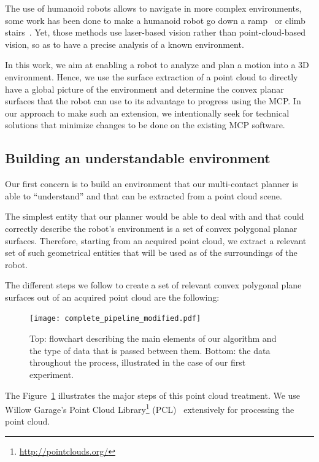 The use of humanoid robots allows to navigate in more complex environments, some work has been done to make a humanoid robot go down a ramp~\cite{lutz:iros:2012} or climb stairs~\cite{osswald:iros:2012}.
Yet, those methods use laser-based vision rather than point-cloud-based vision, so as to have a precise analysis of a known environment.

In this work, we aim at enabling a robot to analyze and plan a motion into a 3D environment.
Hence, we use the surface extraction of a point cloud to directly have a global picture of the environment and determine the convex planar surfaces that the robot can use to its advantage to progress using the MCP.\@
In our approach to make such an extension, we intentionally seek for technical solutions that minimize changes to be done on the existing MCP software.

\subsection{Building an understandable environment}
\label{sub:building_an_understandable_environment}

Our first concern is to build an environment that our multi-contact planner is able to ``understand'' and that can be extracted from a point cloud scene.

The simplest entity that our planner would be able to deal with and that could correctly describe the robot's environment is a set of convex polygonal planar surfaces.
Therefore, starting from an acquired point cloud, we extract a relevant set of such geometrical entities that will be used as of the surroundings of the robot.

The different steps we follow to create a set of relevant convex polygonal plane surfaces out of an acquired point cloud are the following:

\begin{figure}
\centering
  \texttt{[image: complete\_pipeline\_modified.pdf]}
  \caption{Top: flowchart describing the main elements of our algorithm and the type of data that is passed between them. Bottom: the data throughout the process, illustrated in the case of our first experiment.}
\label{fig:full_pipeline}
\end{figure}

The Figure~\ref{fig:full_pipeline} illustrates the major steps of this point cloud treatment.
We use Willow Garage's Point Cloud Library\footnote{\url{http://pointclouds.org/}} (PCL)~\cite{rusu:icra:2011} extensively for processing the point cloud.

